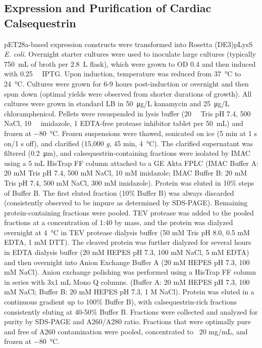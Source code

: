 \subsection*{Expression and Purification of Cardiac Calsequestrin}
pET28a-based expression constructs were transformed into Rosetta (DE3)pLysS \textit{E. coli}. Overnight starter cultures were used to inoculate large cultures (typically \SI{750}{\milli\liter} of broth per \SI{2.8}{\liter} flask), which were grown to OD 0.4 and then induced with \SI{0.25}{\milli\Molar} IPTG. Upon induction, temperature was reduced from \SI{37}{\degreeCelsius} to \SI{24}{\degreeCelsius}. Cultures were grown for 6-9 hours post-induction or overnight and then spun down (optimal yields were observed from shorter durations of growth). All cultures were grown in standard LB in \SI{50}{\micro\gram/\liter} kanamycin and \SI{25}{\micro\gram/\liter} chloramphenicol. Pellets were resuspended in lysis buffer (\SI{20}{\milli\Molar} Tris pH 7.4, \SI{500}{\milli\Molar} NaCl, \SI{10}{\milli\Molar} imidazole, 1 EDTA-free protease inhibitor tablet per \SI{50}{\milli\liter}) and frozen at \SI{-80}{\degreeCelsius}. Frozen suspensions were thawed, sonicated on ice (5 min at 1 s on/1 s off), and clarified (15,000 \textit{g}, 45 min, \SI{4}{\degreeCelsius}). The clarified supernatant was filtered (\SI{0.2}{\micro\meter}), and calsequestrin-containing fractions were isolated by IMAC using a 5 mL HisTrap FF column attached to a GE Akta FPLC (IMAC Buffer A: 20 mM Tris pH 7.4, 500 mM NaCl, 10 mM imidazole; IMAC Buffer B: 20 mM Tris pH 7.4, 500 mM NaCl, 300 mM imidazole). Protein was eluted in 10\% steps of Buffer B. The first eluted fraction (10\% Buffer B) was always discarded (consistently observed to be impure as determined by SDS-PAGE). Remaining protein-containing fractions were pooled. TEV protease was added to the pooled fractions at a concentration of 1:40 by mass, and the protein was dialyzed overnight at \SI{4}{\degreeCelsius} in TEV protease dialysis buffer (50 mM Tris pH 8.0, 0.5 mM EDTA, 1 mM DTT). The cleaved protein was further dialyzed for several hours in EDTA dialysis buffer (20 mM HEPES pH 7.3, 100 mM NaCl, 5 mM EDTA) and then overnight into Anion Exchange Buffer A (20 mM HEPES pH 7.3, 100 mM NaCl). Anion exchange polishing was performed using a HisTrap FF column in series with 3x1 mL Mono Q columns. (Buffer A: 20 mM HEPES pH 7.3, 100 mM NaCl; Buffer B: 20 mM HEPES pH 7.3, 1 M NaCl). Protein was eluted in a continuous gradient up to 100\% Buffer B), with calsequestrin-rich fractions consistently eluting at 40-50\% Buffer B. Fractions were collected and analyzed for purity by SDS-PAGE and A260/A280 ratio. Fractions that were optimally pure and free of A260 contamination were pooled, concentrated to ~20 mg/mL, and frozen at \SI{-80}{\degreeCelsius}.

